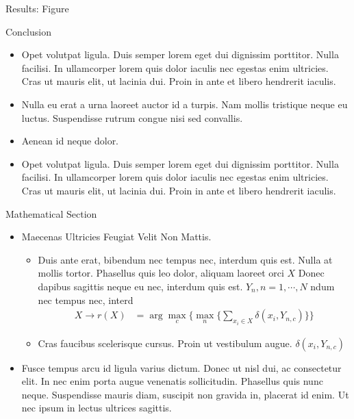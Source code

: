 \documentclass[final,hyperref={pdfpagelabels=false}]{beamer}
\begin{document}
\begin{frame}[t]
\begin{columns}[t]
\begin{column}{.465\textwidth}
\begin{block}{Results: Figure}
\end{block}


\begin{block}{Conclusion}

\begin{itemize}
\item Opet volutpat ligula. Duis semper lorem eget dui dignissim porttitor. Nulla facilisi. In ullamcorper lorem quis dolor iaculis nec egestas enim ultricies. Cras ut mauris elit, ut lacinia dui. Proin in ante et libero hendrerit iaculis.
\item Nulla eu erat a urna laoreet auctor id a turpis. Nam mollis tristique neque eu luctus. Suspendisse rutrum congue nisi sed convallis. 
\item Aenean id neque dolor.
\item Opet volutpat ligula. Duis semper lorem eget dui dignissim porttitor. Nulla facilisi. In ullamcorper lorem quis dolor iaculis nec egestas enim ultricies. Cras ut mauris elit, ut lacinia dui. Proin in ante et libero hendrerit iaculis.
\end{itemize}

\end{block}


\begin{block}{Mathematical Section}

\begin{itemize}
\item Maecenas Ultricies Feugiat Velit Non Mattis.
\begin{itemize}
\item Duis ante erat, bibendum nec tempus nec, interdum quis est. Nulla at mollis tortor. Phasellus quis leo dolor, aliquam laoreet orci $X$ Donec dapibus sagittis neque eu nec, interdum quis est. $Y_n, n=1,\cdots,N$ ndum nec tempus nec, interd
\begin{align*}
X \rightarrow r(X) & = \arg \max_{c} \Big\{ \max_n \big\{ \sum_{x_i \in X} \delta(x_i,Y_{n,c})\big\} \Big\} 
\end{align*}
\item Cras faucibus scelerisque cursus. Proin ut vestibulum augue. $\delta(x_i,Y_{n,c})$
\end{itemize}
\item Fusce tempus arcu id ligula varius dictum. Donec ut nisl dui, ac consectetur elit. In nec enim porta augue venenatis sollicitudin. Phasellus quis nunc neque. Suspendisse mauris diam, suscipit non gravida in, placerat id enim. Ut nec ipsum in lectus ultrices sagittis.
\end{itemize}


\end{block}
\end{column}
\end{columns}
\end{frame}
\end{document}
